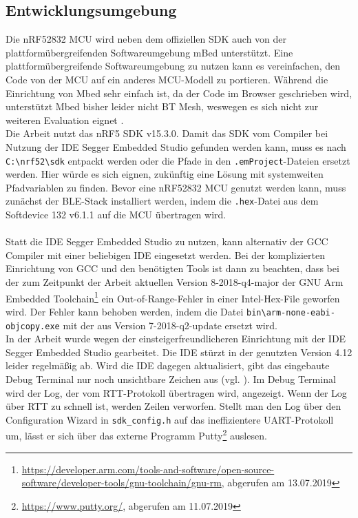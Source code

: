 \subsection{Entwicklungsumgebung}
Die nRF52832 MCU wird neben dem offiziellen SDK auch von der plattformübergreifenden Softwareumgebung mBed unterstützt.
Eine plattformübergreifende Softwareumgebung zu nutzen kann es vereinfachen, den Code von der MCU auf ein anderes MCU-Modell zu portieren.
Während die Einrichtung von Mbed sehr einfach ist, da der Code im Browser geschrieben wird, unterstützt Mbed bisher leider nicht BT Mesh, weswegen es sich nicht zur weiteren Evaluation eignet \cite{site_mbedMesh}.\\
Die Arbeit nutzt das nRF5 SDK v15.3.0.
Damit das SDK vom Compiler bei Nutzung der IDE Segger Embedded Studio gefunden werden kann, muss es nach \texttt{C:\textbackslash{}nrf52\textbackslash{}sdk} entpackt werden oder die Pfade in den \texttt{.emProject}-Dateien ersetzt werden.
Hier würde es sich eignen, zukünftig eine Lösung mit systemweiten Pfadvariablen zu finden.
Bevor eine nRF52832 MCU genutzt werden kann, muss zunächst der BLE-Stack installiert werden, indem die \texttt{.hex}-Datei aus dem Softdevice 132 v6.1.1 auf die MCU übertragen wird.\\\\
Statt die IDE Segger Embedded Studio zu nutzen, kann alternativ der GCC Compiler mit einer beliebigen IDE eingesetzt werden.
Bei der komplizierten Einrichtung von GCC und den benötigten Tools ist dann zu beachten, dass bei der zum Zeitpunkt der Arbeit aktuellen Version 8-2018-q4-major der GNU Arm Embedded Toolchain\footnote{\url{https://developer.arm.com/tools-and-software/open-source-software/developer-tools/gnu-toolchain/gnu-rm}, abgerufen am 13.07.2019} ein Out-of-Range-Fehler in einer Intel-Hex-File geworfen wird.
Der Fehler kann behoben werden, indem die Datei \texttt{bin\textbackslash{}arm-none-eabi-objcopy.exe} mit der aus Version 7-2018-q2-update ersetzt wird.\\
In der Arbeit wurde wegen der einsteigerfreundlicheren Einrichtung mit der IDE Segger Embedded Studio gearbeitet.
Die IDE stürzt in der genutzten Version 4.12 leider regelmäßig ab.
Wird die IDE dagegen aktualisiert, gibt das eingebaute Debug Terminal nur noch unsichtbare Zeichen aus (vgl. \cite{site_sesDebug}).
Im Debug Terminal wird der Log, der vom RTT-Protokoll übertragen wird, angezeigt.
Wenn der Log über RTT zu schnell ist, werden Zeilen verworfen.
Stellt man den Log über den Configuration Wizard in \texttt{sdk\_config.h} auf das ineffizientere UART-Protokoll um, lässt er sich über das externe Programm Putty\footnote{\url{https://www.putty.org/}, abgerufen am 11.07.2019} auslesen.

